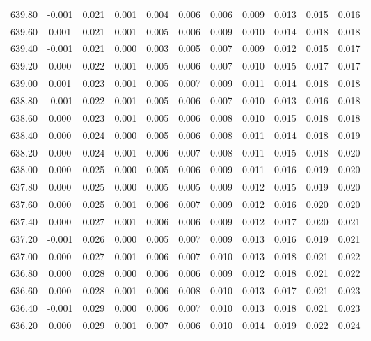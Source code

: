 \begin{longtable}{cccccccccc}
    639.80 & -0.001 &  0.021 &  0.001 &  0.004 &  0.006 &  0.006 &  0.009 &  0.013 &  0.015 &  0.016 \\
    639.60 &  0.001 &  0.021 &  0.001 &  0.005 &  0.006 &  0.009 &  0.010 &  0.014 &  0.018 &  0.018 \\
    639.40 & -0.001 &  0.021 &  0.000 &  0.003 &  0.005 &  0.007 &  0.009 &  0.012 &  0.015 &  0.017 \\
    639.20 &  0.000 &  0.022 &  0.001 &  0.005 &  0.006 &  0.007 &  0.010 &  0.015 &  0.017 &  0.017 \\
    639.00 &  0.001 &  0.023 &  0.001 &  0.005 &  0.007 &  0.009 &  0.011 &  0.014 &  0.018 &  0.018 \\
    638.80 & -0.001 &  0.022 &  0.001 &  0.005 &  0.006 &  0.007 &  0.010 &  0.013 &  0.016 &  0.018 \\
    638.60 &  0.000 &  0.023 &  0.001 &  0.005 &  0.006 &  0.008 &  0.010 &  0.015 &  0.018 &  0.018 \\
    638.40 &  0.000 &  0.024 &  0.000 &  0.005 &  0.006 &  0.008 &  0.011 &  0.014 &  0.018 &  0.019 \\
    638.20 &  0.000 &  0.024 &  0.001 &  0.006 &  0.007 &  0.008 &  0.011 &  0.015 &  0.018 &  0.020 \\
    638.00 &  0.000 &  0.025 &  0.000 &  0.005 &  0.006 &  0.009 &  0.011 &  0.016 &  0.019 &  0.020 \\
    637.80 &  0.000 &  0.025 &  0.000 &  0.005 &  0.005 &  0.009 &  0.012 &  0.015 &  0.019 &  0.020 \\
    637.60 &  0.000 &  0.025 &  0.001 &  0.006 &  0.007 &  0.009 &  0.012 &  0.016 &  0.020 &  0.020 \\
    637.40 &  0.000 &  0.027 &  0.001 &  0.006 &  0.006 &  0.009 &  0.012 &  0.017 &  0.020 &  0.021 \\
    637.20 & -0.001 &  0.026 &  0.000 &  0.005 &  0.007 &  0.009 &  0.013 &  0.016 &  0.019 &  0.021 \\
    637.00 &  0.000 &  0.027 &  0.001 &  0.006 &  0.007 &  0.010 &  0.013 &  0.018 &  0.021 &  0.022 \\
    636.80 &  0.000 &  0.028 &  0.000 &  0.006 &  0.006 &  0.009 &  0.012 &  0.018 &  0.021 &  0.022 \\
    636.60 &  0.000 &  0.028 &  0.001 &  0.006 &  0.008 &  0.010 &  0.013 &  0.017 &  0.021 &  0.023 \\
    636.40 & -0.001 &  0.029 &  0.000 &  0.006 &  0.007 &  0.010 &  0.013 &  0.018 &  0.021 &  0.023 \\
    636.20 &  0.000 &  0.029 &  0.001 &  0.007 &  0.006 &  0.010 &  0.014 &  0.019 &  0.022 &  0.024 \\

\end{longtable}
